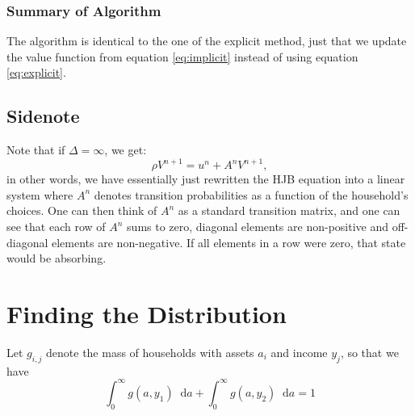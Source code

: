\documentclass[12pt]{article}
\DeclareMathOperator{\1}{\mathbbm{1}}
\newcommand*\diff{\mathop{}\!\mathrm{d}}
\begin{document}
\subsubsection{Summary of Algorithm}
The algorithm is identical to the one of the explicit method, just that we update the value function from equation \eqref{eq:implicit} instead of using equation \eqref{eq:explicit}.



\subsection{Sidenote}
Note that if $\Delta = \infty$, we get:
\begin{equation}
\rho V^{n+1} = u^n + A^n V^{n+1},
\end{equation}
in other words, we have essentially just rewritten the HJB equation into a linear system where $A^n$ denotes transition probabilities as a function of the household's choices. One can then think of $A^n$ as a standard transition matrix, and one can see that each row of $A^n$ sums to zero, diagonal elements are non-positive and off-diagonal elements are non-negative. If all elements in a row were zero, that state would be absorbing.


\section{Finding the Distribution}
Let $g_{i,j}$ denote the mass of households with assets $a_i$ and income $y_j$, so that we have
\begin{equation}
\int_0^\infty g(a,y_1)\diff a + \int_0^\infty g(a,y_2)\diff a =1
\end{equation}
\end{document}

